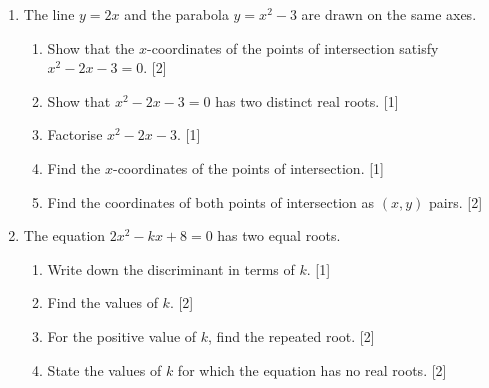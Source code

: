 \documentclass[12pt, twoside]{article}
\begin{document}
\begin{enumerate}[itemsep=0.15cm]
\newpage

\item[3.] [Maximum mark: 7]

The line $y = 2x$ and the parabola $y = x^2 - 3$ are drawn
on the same axes.

\begin{enumerate}[itemsep=0.15cm]
  \item Show that the $x$-coordinates of the points of intersection
  satisfy \\[0.25cm]
  $x^2 - 2x - 3 = 0$. \hfill [2]
  \item Show that $x^2 - 2x - 3=0$ has two distinct real roots. \hfill [1]
  \item Factorise $x^2 - 2x - 3$. \hfill [1]
  \item Find the $x$-coordinates of the points of intersection. \hfill [1]
  \item Find the coordinates of both points of intersection as $(x, y)$ pairs. \hfill [2]
\end{enumerate}


\newpage

\item[4.] [Maximum mark: 7]

The equation $2x^2 - kx + 8 = 0$ has two equal roots.

\begin{enumerate}[itemsep=0.15cm]
  \item Write down the discriminant in terms of $k$. \hfill [1]
  \item Find the values of $k$. \hfill [2]
  \item For the positive value of $k$, find the repeated root. \hfill [2]
  \item State the values of $k$ for which the equation has no
  real roots. \hfill [2]
\end{enumerate}


\end{enumerate}
\end{document}
